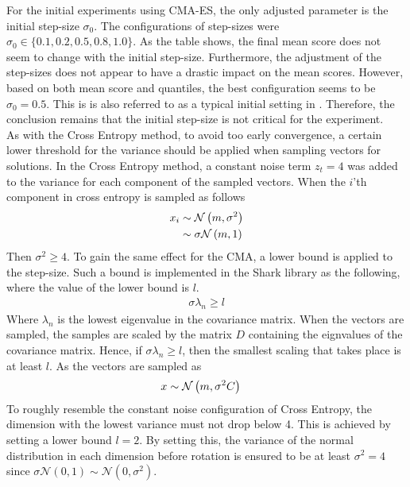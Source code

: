 For the initial experiments using CMA-ES, 
the only adjusted parameter is the initial 
step-size $\sigma_0$. The configurations of step-sizes were 
$\sigma_0 \in \{0.1, 0.2, 0.5, 0.8, 1.0\}$. As the table shows,
the final mean score does not seem to change with the initial step-size.
Furthermore, the adjustment of the step-sizes does not appear to 
have a drastic impact on the mean scores. However, based on both mean score and
quantiles, the best configuration seems to be $\sigma_0 = 0.5$. This is 
is also referred to as a typical initial setting in \citep{boumaza2009}.
Therefore, the conclusion remains that the initial step-size is not critical 
for the experiment.\\

As with the Cross Entropy method, to avoid too early convergence, a 
certain lower threshold for the variance should be applied when 
sampling vectors for solutions. In the Cross Entropy method, a constant 
noise term $z_t = 4$ was added to the variance for each component
of the sampled vectors. When the $i$'th component in cross entropy is
sampled as follows
\begin{align*}
x_i &\sim \mathcal{N}\left(m, \sigma^{2}\right)\\
              &\sim \sigma \mathcal{N}\left(m, 1\right)
\end{align*}
Then $\sigma^{2} \geq 4$. To gain the same effect for the CMA, a lower bound 
is applied to the step-size. Such a bound is implemented in the Shark library
as the following, where the value of the lower bound is $l$.
\begin{align*}
\sigma  \lambda_n \geq l
\end{align*}
Where $\lambda_n$ is the lowest eigenvalue in the covariance matrix. 
When the vectors are sampled, the samples are scaled by the matrix $D$
containing the eignvalues of the covariance matrix. 
Hence, if $\sigma \lambda_n \geq l$, then the smallest scaling
that takes place is at least $l$. As the vectors are sampled
as
\begin{align*}
x &\sim \mathcal{N}\left( m, \sigma^{2}C \right)
\end{align*}
To roughly resemble the constant noise configuration of Cross Entropy,
the dimension with the lowest variance must not drop below 4. 
This is achieved by setting a lower bound $l=2$. By setting this, 
the variance of the normal distribution in each dimension 
before rotation is ensured to be at least $\sigma^{2} = 4$
since $\sigma \mathcal{N}\left( 0, 1 \right) \sim 
\mathcal{N}\left( 0, \sigma^{2} \right)$.


